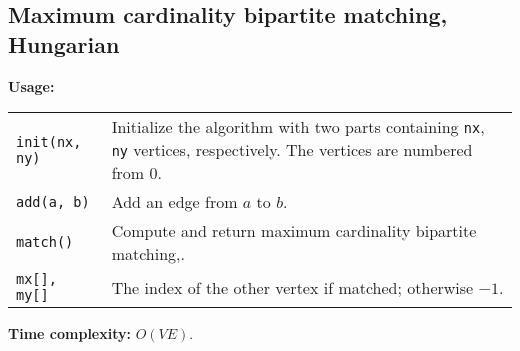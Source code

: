 \subsection{Maximum cardinality bipartite matching, Hungarian}
\textbf{Usage:} \\[0.1cm]
\begin{tabular}{p{2.5cm} p{8cm}}
  \lstinline|init(nx, ny)| & Initialize the algorithm with two parts containing  \lstinline|nx|,  \lstinline|ny| vertices, respectively. The vertices are numbered from 0. \\
  \lstinline|add(a, b)| & Add an edge from $a$ to $b$. \\
  \lstinline|match()| & Compute and return maximum cardinality bipartite matching,. \\
  \lstinline|mx[], my[]| & The index of the other vertex if matched; otherwise $-1$. \\
\end{tabular} \par
\textbf{Time complexity:} $O(VE)$. \par


